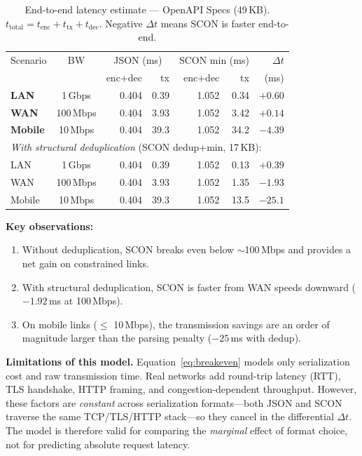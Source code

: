 \documentclass[11pt, a4paper]{article}
\begin{document}
\begin{table}[ht]
\centering
\caption{End-to-end latency estimate --- OpenAPI Specs (49\,KB).
         $t_{\text{total}} = t_{\text{enc}} + t_{\text{tx}} + t_{\text{dec}}$.
         Negative $\Delta t$ means SCON is faster end-to-end.}
\label{tab:e2e}
\begin{tabular}{l c rr rr r}
\toprule
Scenario & BW & \multicolumn{2}{c}{JSON (ms)} & \multicolumn{2}{c}{SCON min (ms)} & $\Delta t$ \\
         &    & enc+dec & tx & enc+dec & tx & (ms) \\
\midrule
\textbf{LAN}
  & 1\,Gbps   & 0.404 & 0.39 & 1.052 & 0.34 & $+0.60$ \\
\textbf{WAN}
  & 100\,Mbps & 0.404 & 3.93 & 1.052 & 3.42 & $+0.14$ \\
\textbf{Mobile}
  & 10\,Mbps  & 0.404 & 39.3 & 1.052 & 34.2 & $-4.39$ \\
\midrule
\multicolumn{7}{l}{\textit{With structural deduplication} (SCON dedup+min, 17\,KB):} \\
\midrule
LAN     & 1\,Gbps   & 0.404 & 0.39 & 1.052 & 0.13 & $+0.39$ \\
WAN     & 100\,Mbps & 0.404 & 3.93 & 1.052 & 1.35 & $-1.93$ \\
Mobile  & 10\,Mbps  & 0.404 & 39.3 & 1.052 & 13.5 & $-25.1$ \\
\bottomrule
\end{tabular}
\end{table}

\noindent \textbf{Key observations:}
\begin{enumerate}
\item Without deduplication, SCON breaks even below $\sim$100\,Mbps and
      provides a net gain on constrained links.
\item With structural deduplication, SCON is faster from WAN speeds
      downward ($-1.92$\,ms at 100\,Mbps).
\item On mobile links ($\leq$ 10\,Mbps), the transmission savings
      are an order of magnitude larger than the parsing penalty
      ($-25$\,ms with dedup).
\end{enumerate}

\noindent \textbf{Limitations of this model.}
Equation~\eqref{eq:breakeven} models only serialization cost and raw
transmission time. Real networks add round-trip latency (RTT), TLS
handshake, HTTP framing, and congestion-dependent throughput.
However, these factors are \emph{constant} across serialization
formats---both JSON and SCON traverse the same TCP/TLS/HTTP stack---so
they cancel in the differential $\Delta t$.
The model is therefore valid for comparing the \emph{marginal} effect
of format choice, not for predicting absolute request latency.
\end{document}
